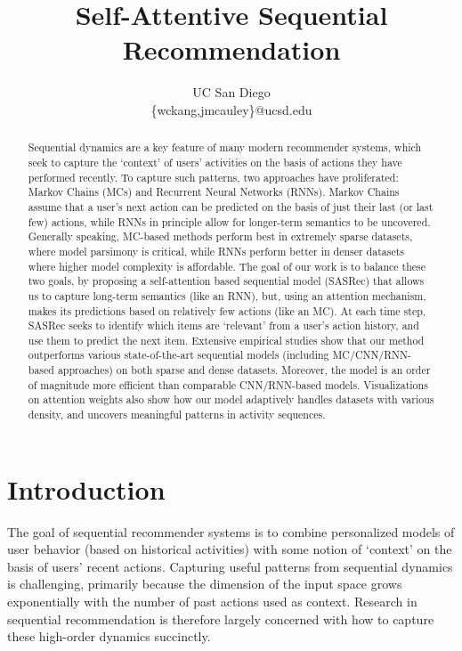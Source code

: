 \documentclass[conference]{IEEEtran}
\begin{document}
\title{Self-Attentive Sequential Recommendation}

\author{
UC San Diego\\
\{wckang,jmcauley\}@ucsd.edu}


\maketitle

\begin{abstract}
Sequential dynamics are a key feature of many modern recommender systems, which seek to capture the `context' of users' activities on the basis of actions they have performed recently.
To capture such patterns, 
two approaches have proliferated:
Markov Chains (MCs) and Recurrent Neural Networks (RNNs). Markov Chains assume that 
a user's next action can be predicted on the basis of just their last (or last few) actions, while RNNs in principle allow for longer-term semantics to be uncovered.
Generally speaking, MC-based methods perform best in extremely sparse datasets, where model parsimony is critical, while RNNs perform better in denser datasets where higher model complexity is affordable.
The goal of our work is to balance these two goals, by proposing a self-attention based sequential model (SASRec) that allows us to capture long-term semantics (like an RNN), but, using an attention mechanism, makes its predictions based on relatively few actions (like an MC).
At each time step, SASRec seeks to identify 
which items are `relevant' from a user's action history,
and use them to predict the next item. Extensive empirical studies show that our method 
outperforms various state-of-the-art sequential models (including MC/CNN/RNN-based approaches) on both sparse and dense datasets. Moreover, the model is 
an order of magnitude more
efficient than comparable CNN/RNN-based models.
Visualizations on attention weights also show how our model adaptively handles datasets with various density, and uncovers meaningful patterns in activity sequences.
\end{abstract}





\section{Introduction}



The goal of sequential recommender systems is to combine personalized models of user behavior (based on historical activities) with some notion of `context' on the basis of users' recent actions. Capturing useful patterns from sequential dynamics is challenging, primarily because the dimension of the input space grows exponentially with the number of past actions used as context. Research in sequential recommendation is therefore largely concerned with how to capture these high-order dynamics succinctly.
\end{document}
